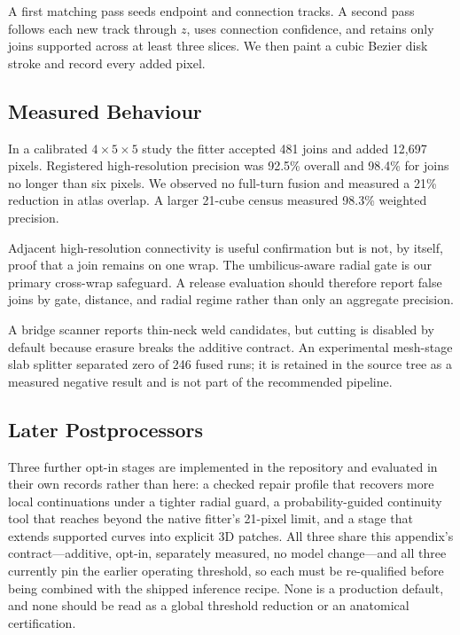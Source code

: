 A first matching pass seeds endpoint and connection tracks.
A second pass follows each new track through $z$, uses connection confidence,
and retains only joins supported across at least three slices.
We then paint a cubic Bezier disk stroke and record every added pixel.

\subsection{Measured Behaviour}

In a calibrated $4\!\times\!5\!\times\!5$ study the fitter accepted 481 joins
and added 12,697 pixels.
Registered high-resolution precision was 92.5\% overall and 98.4\% for joins no
longer than six pixels.
We observed no full-turn fusion and measured a 21\% reduction in atlas overlap.
A larger 21-cube census measured 98.3\% weighted precision.

Adjacent high-resolution connectivity is useful confirmation but is not, by
itself, proof that a join remains on one wrap.
The umbilicus-aware radial gate is our primary cross-wrap safeguard.
A release evaluation should therefore report false joins by gate, distance, and
radial regime rather than only an aggregate precision.

A bridge scanner reports thin-neck weld candidates, but cutting is disabled by
default because erasure breaks the additive contract.
An experimental mesh-stage slab splitter separated zero of 246 fused runs; it is
retained in the source tree as a measured negative result and is not part of the
recommended pipeline.

\subsection{Later Postprocessors}

Three further opt-in stages are implemented in the repository and evaluated in
their own records rather than here: a checked repair profile that recovers more
local continuations under a tighter radial guard, a probability-guided
continuity tool that reaches beyond the native fitter's 21-pixel limit, and a
stage that extends supported curves into explicit 3D patches.
All three share this appendix's contract---additive, opt-in, separately
measured, no model change---and all three currently pin the earlier operating
threshold, so each must be re-qualified before being combined with the shipped
inference recipe.
None is a production default, and none should be read as a global threshold
reduction or an anatomical certification.

